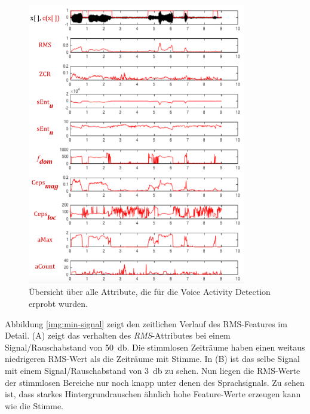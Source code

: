 \begin{figure}[h]
	\centering
	\includegraphics[width=0.85\textwidth]{bilder/allFeatures01.png}
	\caption[Übersicht über alle Attribute, die für die VAD erprobt wurden]{Übersicht über alle Attribute, die für die Voice Activity Detection erprobt wurden.}
	\label{img:vadAllFeatures}
\end{figure}

Abbildung \ref{img:min-signal} zeigt den zeitlichen Verlauf des RMS-Features im Detail. (A) zeigt das verhalten des \emph{RMS}-Attributes bei einem Signal/Rauschabstand von \SI{50}{\decibel}. Die stimmlosen Zeiträume haben einen weitaus niedrigeren RMS-Wert als die Zeiträume mit Stimme. In (B) ist das selbe Signal mit einem Signal/Rauschabstand von \SI{3}{\decibel} zu sehen. Nun liegen die RMS-Werte der stimmlosen Bereiche nur noch knapp unter denen des Sprachsignals. Zu sehen ist, dass starkes Hintergrundrauschen ähnlich hohe Feature-Werte erzeugen kann wie die Stimme.

